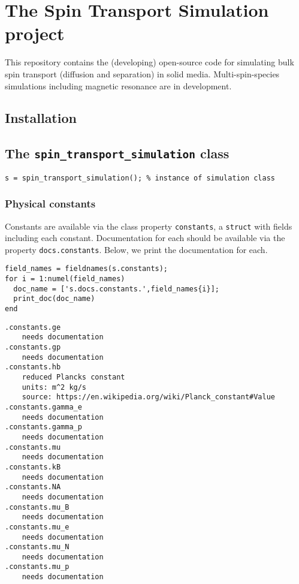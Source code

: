 \hypertarget{the-spin-transport-simulation-project}{%
\section{The Spin Transport Simulation
project}\label{the-spin-transport-simulation-project}}

This repository contains the (developing) open-source code for
simulating bulk spin transport (diffusion and separation) in solid
media. Multi-spin-species simulations including magnetic resonance are
in development.

\hypertarget{installation}{%
\subsection{Installation}\label{installation}}

\hypertarget{the-spin_transport_simulation-class}{%
\subsection{\texorpdfstring{The
\texttt{spin_transport_simulation}
class}{The  class}}\label{the-spin_transport_simulation-class}}

\begin{verbatim}
s = spin_transport_simulation(); % instance of simulation class
\end{verbatim}

\hypertarget{physical-constants}{%
\subsubsection{Physical constants}\label{physical-constants}}

Constants are available via the class property
\texttt{constants}, a \texttt{struct} with
fields including each constant. Documentation for each should be
available via the property \texttt{docs.constants}. Below,
we print the documentation for each.

\begin{verbatim}
field_names = fieldnames(s.constants);
for i = 1:numel(field_names)
  doc_name = ['s.docs.constants.',field_names{i}];
  print_doc(doc_name)
end
\end{verbatim}

\begin{verbatim}
.constants.ge
    needs documentation
.constants.gp
    needs documentation
.constants.hb
    reduced Plancks constant
    units: m^2 kg/s
    source: https://en.wikipedia.org/wiki/Planck_constant#Value
.constants.gamma_e
    needs documentation
.constants.gamma_p
    needs documentation
.constants.mu
    needs documentation
.constants.kB
    needs documentation
.constants.NA
    needs documentation
.constants.mu_B
    needs documentation
.constants.mu_e
    needs documentation
.constants.mu_N
    needs documentation
.constants.mu_p
    needs documentation
\end{verbatim}

